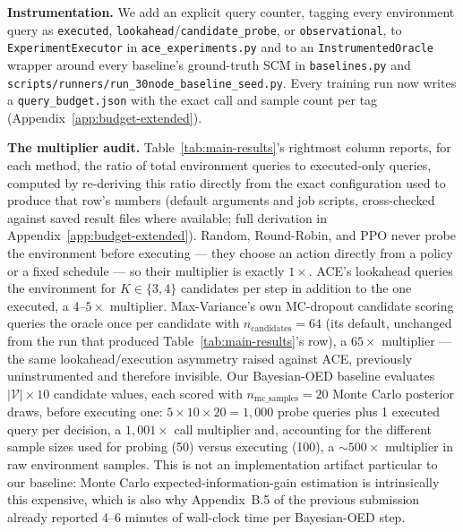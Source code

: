 \documentclass{article}
\theoremstyle{plain}
\theoremstyle{definition}
\theoremstyle{remark}
\begin{document}
\textbf{Instrumentation.} We add an explicit query counter, tagging every environment query as \texttt{executed}, \texttt{lookahead}/\texttt{candidate\_probe}, or \texttt{observational}, to \texttt{ExperimentExecutor} in \texttt{ace\_experiments.py} and to an \texttt{InstrumentedOracle} wrapper around every baseline's ground-truth SCM in \texttt{baselines.py} and \texttt{scripts/runners/run\_30node\_baseline\_seed.py}. Every training run now writes a \texttt{query\_budget.json} with the exact call and sample count per tag (Appendix~\ref{app:budget-extended}).

\textbf{The multiplier audit.} Table~\ref{tab:main-results}'s rightmost column reports, for each method, the ratio of total environment queries to executed-only queries, computed by re-deriving this ratio directly from the exact configuration used to produce that row's numbers (default arguments and job scripts, cross-checked against saved result files where available; full derivation in Appendix~\ref{app:budget-extended}). Random, Round-Robin, and PPO never probe the environment before executing --- they choose an action directly from a policy or a fixed schedule --- so their multiplier is exactly $1\times$. ACE's lookahead queries the environment for $K\in\{3,4\}$ candidates per step in addition to the one executed, a $4$--$5\times$ multiplier. Max-Variance's own MC-dropout candidate scoring queries the oracle once per candidate with $n_\text{candidates}=64$ (its default, unchanged from the run that produced Table~\ref{tab:main-results}'s row), a $65\times$ multiplier --- the same lookahead/execution asymmetry raised against ACE, previously uninstrumented and therefore invisible. Our Bayesian-OED baseline evaluates $|\mathcal V|\times 10$ candidate values, each scored with $n_\text{mc\_samples}=20$ Monte Carlo posterior draws, before executing one: $5\times10\times20 = 1{,}000$ probe queries plus 1 executed query per decision, a $1{,}001\times$ call multiplier and, accounting for the different sample sizes used for probing (50) versus executing (100), a $\sim\!500\times$ multiplier in raw environment samples. This is not an implementation artifact particular to our baseline: Monte Carlo expected-information-gain estimation is intrinsically this expensive, which is also why Appendix~B.5 of the previous submission already reported 4--6 minutes of wall-clock time per Bayesian-OED step.
\end{document}
